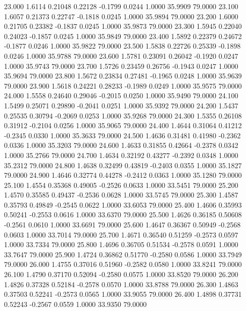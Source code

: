   23.000   1.6114   0.21048   0.22128  -0.1799   0.0244   1.0000  35.9909  79.0000
  23.100   1.6057   0.21373   0.22747  -0.1818   0.0245   1.0000  35.9894  79.0000
  23.200   1.6000   0.21705   0.23382  -0.1837   0.0245   1.0000  35.9873  79.0000
  23.300   1.5945   0.22040   0.24023  -0.1857   0.0245   1.0000  35.9849  79.0000
  23.400   1.5892   0.22379   0.24672  -0.1877   0.0246   1.0000  35.9822  79.0000
  23.500   1.5838   0.22726   0.25339  -0.1898   0.0246   1.0000  35.9788  79.0000
  23.600   1.5781   0.23091   0.26042  -0.1920   0.0247   1.0000  35.9743  79.0000
  23.700   1.5726   0.23459   0.26756  -0.1943   0.0247   1.0000  35.9694  79.0000
  23.800   1.5672   0.23834   0.27481  -0.1965   0.0248   1.0000  35.9639  79.0000
  23.900   1.5618   0.24221   0.28233  -0.1989   0.0249   1.0000  35.9575  79.0000
  24.000   1.5558   0.24640   0.29046  -0.2015   0.0250   1.0000  35.9490  79.0000
  24.100   1.5499   0.25071   0.29890  -0.2041   0.0251   1.0000  35.9392  79.0000
  24.200   1.5437   0.25535   0.30794  -0.2069   0.0253   1.0000  35.9268  79.0000
  24.300   1.5355   0.26108   0.31912  -0.2104   0.0256   1.0000  35.9065  79.0000
  24.400   1.4644   0.31064   0.41212  -0.2345   0.0330   1.0000  35.3633  79.0000
  24.500   1.4636   0.31481   0.41980  -0.2362   0.0336   1.0000  35.3203  79.0000
  24.600   1.4633   0.31855   0.42664  -0.2378   0.0342   1.0000  35.2766  79.0000
  24.700   1.4634   0.32192   0.43277  -0.2392   0.0348   1.0000  35.2312  79.0000
  24.800   1.4638   0.32499   0.43819  -0.2403   0.0355   1.0000  35.1827  79.0000
  24.900   1.4646   0.32774   0.44278  -0.2412   0.0363   1.0000  35.1280  79.0000
  25.100   1.4554   0.35368   0.49005  -0.2526   0.0633   1.0000  33.5451  79.0000
  25.200   1.4570   0.35585   0.49437  -0.2536   0.0628   1.0000  33.5745  79.0000
  25.300   1.4587   0.35793   0.49849  -0.2545   0.0622   1.0000  33.6053  79.0000
  25.400   1.4606   0.35993   0.50241  -0.2553   0.0616   1.0000  33.6370  79.0000
  25.500   1.4626   0.36185   0.50608  -0.2561   0.0610   1.0000  33.6691  79.0000
  25.600   1.4647   0.36367   0.50949  -0.2568   0.0603   1.0000  33.7014  79.0000
  25.700   1.4671   0.36540   0.51259  -0.2573   0.0597   1.0000  33.7334  79.0000
  25.800   1.4696   0.36705   0.51534  -0.2578   0.0591   1.0000  33.7647  79.0000
  25.900   1.4724   0.36862   0.51770  -0.2580   0.0586   1.0000  33.7949  79.0000
  26.000   1.4755   0.37016   0.51960  -0.2582   0.0580   1.0000  33.8241  79.0000
  26.100   1.4790   0.37170   0.52094  -0.2580   0.0575   1.0000  33.8520  79.0000
  26.200   1.4826   0.37328   0.52184  -0.2578   0.0570   1.0000  33.8788  79.0000
  26.300   1.4863   0.37503   0.52241  -0.2573   0.0565   1.0000  33.9055  79.0000
  26.400   1.4898   0.37731   0.52243  -0.2567   0.0559   1.0000  33.9350  79.0000
